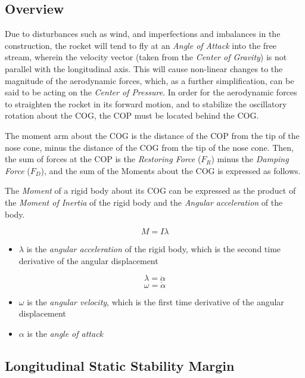 \documentclass[]{article}
\providecommand{\tightlist}{%
  \setlength{\itemsep}{0pt}\setlength{\parskip}{0pt}}
\begin{document}
\subsection{Overview}\label{overview}

Due to disturbances such as wind, and imperfections and imbalances in
the construction, the rocket will tend to fly at an \emph{Angle of
Attack} into the free stream, wherein the velocity vector (taken from
the \emph{Center of Gravity}) is not parallel with the longitudinal
axis. This will cause non-linear changes to the magnitude of the
aerodynamic forces, which, as a further simplification, can be said to
be acting on the \emph{Center of Pressure}. In order for the aerodynamic
forces to straighten the rocket in its forward motion, and to stabilize
the oscillatory rotation about the COG, the COP must be located behind
the COG.

The moment arm about the COG is the distance of the COP from the tip of
the nose cone, minus the distance of the COG from the tip of the nose
cone. Then, the sum of forces at the COP is the \emph{Restoring Force}
(\(F_R\)) minus the \emph{Damping Force} (\(F_D\)), and the sum of the
Moments about the COG is expressed as follows.

The \emph{Moment} of a rigid body about its COG can be expressed as the
product of the \emph{Moment of Inertia} of the rigid body and the
\emph{Angular acceleration} of the body.

\begin{equation}
\label{eq_moment}
M = I \lambda 
\end{equation}

\begin{itemize}
\tightlist
\item
  \(\lambda\) is the \emph{angular acceleration} of the rigid body,
  which is the second time derivative of the angular displacement
\end{itemize}

\[ 
\lambda = \ddot{\alpha}
\] \[
\omega = \dot{\alpha}
\]

\begin{itemize}
\tightlist
\item
  \(\omega\) is the \emph{angular velocity}, which is the first time
  derivative of the angular displacement
\item
  \(\alpha\) is the \emph{angle of attack}
\end{itemize}

\subsection{Longitudinal Static Stability
Margin}\label{longitudinal-static-stability-margin}
\end{document}
